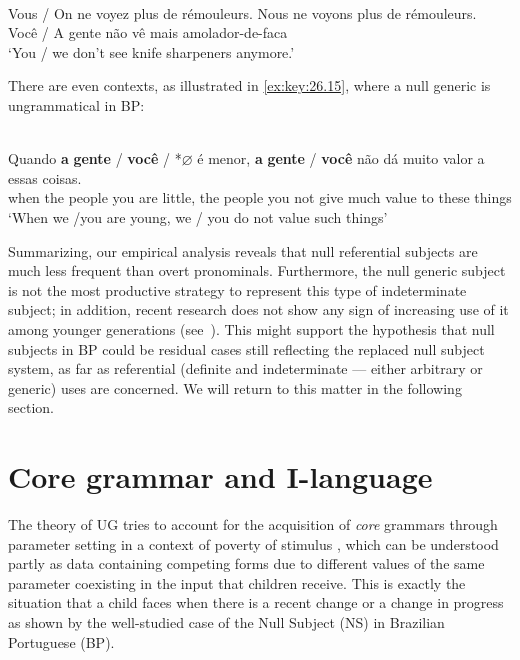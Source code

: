 \documentclass[output=paper]{langsci/langscibook}
\begin{document}
\ea\label{ex:key:26.14}
    \ea {}\\
        Vous / On ne voyez  plus de rémouleurs. Nous ne voyons plus de rémouleurs.
    \ex{}\\
        Você / A gente não vê  mais amolador-de-faca\\
        ‘You / we don't see knife sharpeners anymore.’
    \z
\z

There are even contexts, as illustrated in \eqref{ex:key:26.15}, where a null
generic is ungrammatical in \gls{BP}:

\ea%
    \label{ex:key:26.15}\\
    \gll	Quando \textbf{a} \textbf{gente} / \textbf{você} / *$\varnothing$\textbf{\tss{\Genc}} é  menor, \textbf{a} \textbf{gente} / \textbf{você} não dá muito valor a essas coisas.\\
            when the people {} you {} {} are little, the people {} you not  give much value to these things\\
	\glt	\enquote*{When we /you are young, we / you do not value such things}
\z

Summarizing, our empirical analysis reveals that null referential subjects are
much less frequent than overt pronominals. Furthermore, the null generic
subject is not the most productive strategy to represent this type of
indeterminate subject; in addition, recent research does not show any sign of
increasing use of it among younger generations (see~\citealt{MarinsEtAlta}).
This might support the hypothesis that null subjects in \gls{BP} could be residual cases still reflecting the replaced null subject
system, as far as referential (definite and indeterminate --- either arbitrary
or generic) uses are concerned. We will return to this matter in the following
section.

\section{Core grammar and I-language}\label{sec:key:26.2.3}

The theory of \gls{UG} tries to account for the acquisition of
\emph{core} grammars through parameter setting in a context of poverty of
stimulus \citep{Chomsky1986}, which can be understood partly as data containing
competing forms due to different values of the same parameter coexisting in the
input that children receive. This is exactly the situation that a child faces
when there is a recent change or a change in progress as shown by the
well-studied case of the Null Subject (NS) in Brazilian Portuguese (BP).
\end{document}
